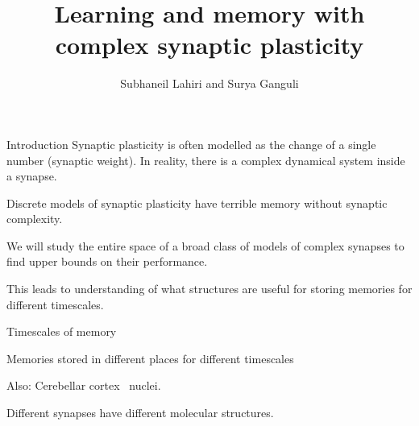 \documentclass{beamer}%
\title[Complex synapses]{Learning and memory with complex synaptic plasticity}
\author[Lahiri and Ganguli]{Subhaneil Lahiri and Surya Ganguli%
}
\institute[Stanford]{%
Stanford University, Applied Physics
}
\begin{document}

\begin{frame}
%
 \titlepage
%
\end{frame}


\begin{frame}{Introduction}
%
 Synaptic plasticity is often modelled as the change of a single number (synaptic weight).
 In reality, there is a complex dynamical system inside a synapse.

 \vp Discrete models of synaptic plasticity have terrible memory without synaptic complexity.

 \vp We will study the entire space of a broad class of models of complex synapses to find upper bounds on their performance.

 \vp This leads to understanding of what structures are useful for storing memories for different timescales.
%
\end{frame}


\begin{frame}{Timescales of memory}
%
 \parbox[t]{0.47\linewidth}{
 Memories stored in different places for different timescales


 \begin{center}
 \end{center}

 Also: Cerebellar cortex \lto\ nuclei.


 }
 \hspace{0.03\linewidth}
 \parbox[t]{0.47\linewidth}{
 Different synapses have different molecular structures.
 \begin{center}
 \end{center}
 }
%
\end{frame}

\end{document}
